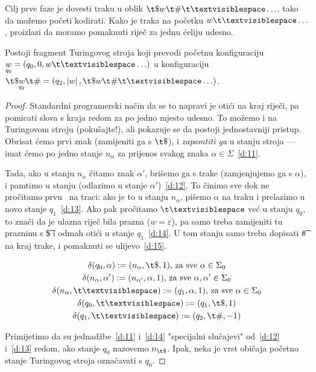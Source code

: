 Cilj prve faze je dovesti traku u oblik $\t\$w\t\#\bl\ldots$, tako da možemo početi kodirati. Kako je traka na početku $w\bl\ldots$, proizlazi da moramo pomaknuti riječ za jednu ćeliju udesno.

\begin{lema}\label{lm:faza1}
Postoji fragment Turingovog stroja koji prevodi početnu konfiguraciju $\underset{q_0}{w}=(q_0,0,w\bl\ldots)$ u konfiguraciju $\t\$\underset{q_2}{w}\t\#=(q_2,\left|w\right|,\t\$w\t\#\bl\ldots)$.
\end{lema}
\begin{proof}
Standardni programerski način da se to napravi je otići na kraj riječi, pa pomicati slova s kraja redom za po jedno mjesto udesno. To možemo i na Turingovom stroju (pokušajte!), ali pokazuje se da postoji jednostavniji pristup. Obrisat ćemo prvi znak (zamijeniti ga s $\t\$$), i \emph{zapamtiti ga} u stanju stroja --- imat ćemo po jedno stanje $n_\alpha$ za prijenos svakog znaka $\alpha\in\Sigma$~\eqref{d:11}.

Tada, ako u stanju $n_\alpha$ čitamo znak $\alpha'$, brišemo ga s trake (zamjenjujemo ga s $\alpha$), i pamtimo u stanju (odlazimo u stanje $\alpha'$)~\eqref{d:12}. To činimo sve dok ne pročitamo prvu \bl\ na traci: ako je to u stanju $n_\alpha$, pišemo $\alpha$ na traku i prelazimo u novo stanje $q_1$~\eqref{d:13}. Ako pak pročitamo $\bl$ već u stanju $q_0$, to znači da je ulazna riječ bila prazna ($w=\varepsilon$), pa samo treba zamijeniti tu prazninu s \t\$ i odmah otići u stanje $q_1$~\eqref{d:14}. U tom stanju samo treba dopisati \t\# na kraj trake, i pomaknuti se ulijevo~\eqref{d:15}.

\noindent\begin{gather}
\label{d:11}
    \delta(q_0,\alpha):=(n_\alpha,\t\$,1)\text{, za sve }\alpha\in\Sigma_0\\
\label{d:12}
    \delta(n_\alpha,\alpha'):=(n_{\alpha'},\alpha,1)\text{, za sve }\alpha,\alpha'\in\Sigma_0\\
\label{d:13}
    \delta(n_\alpha,\bl):=(q_1,\alpha,1)\text{, za sve }\alpha\in\Sigma_0\\
\label{d:14}
    \delta(q_0,\bl):=(q_1,\t\$,1)\\
\label{d:15}
    \delta(q_1,\bl):=(q_2,\t\#,-1)
\end{gather}

Primijetimo da su jednadžbe~\eqref{d:11} i~\eqref{d:14} "specijalni slučajevi" od~\eqref{d:12} i~\eqref{d:13} redom, ako stanje $q_0$ nazovemo $n_{\t\$}$. Ipak, neka je vrst običaja početno stanje Turingovog stroja označavati s $q_0$.
\end{proof}

